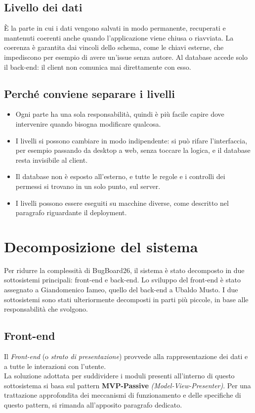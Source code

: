 \subsection{Livello dei dati}
È la parte in cui i dati vengono salvati in modo permanente, recuperati e mantenuti coerenti anche quando l'applicazione viene chiusa o riavviata. La coerenza è garantita dai vincoli dello schema, come le chiavi esterne, che impediscono per esempio di avere un'issue senza autore. Al database accede solo il back-end: il client non comunica mai direttamente con esso.

\subsection{Perché conviene separare i livelli}
\begin{itemize}
  \item Ogni parte ha una sola responsabilità, quindi è più facile capire dove intervenire quando bisogna modificare qualcosa.
  \item I livelli si possono cambiare in modo indipendente: si può rifare l'interfaccia, per esempio passando da desktop a web, senza toccare la logica, e il database resta invisibile al client.
  \item Il database non è esposto all'esterno, e tutte le regole e i controlli dei permessi si trovano in un solo punto, sul server.
  \item I livelli possono essere eseguiti su macchine diverse, come descritto nel paragrafo riguardante il deployment.
\end{itemize}

\section{Decomposizione del sistema}
Per ridurre la complessità di BugBoard26, il sistema è stato decomposto in due sottosistemi principali: front-end e back-end. Lo sviluppo del front-end è stato assegnato a Giandomenico Iameo, quello del back-end a Ubaldo Musto. I due sottosistemi sono stati ulteriormente decomposti in parti più piccole, in base alle responsabilità che svolgono.

\subsection{Front-end}
Il \textit{Front-end} (o \textit{strato di presentazione}) provvede alla rappresentazione dei dati e a tutte le interazioni con l'utente. \\
\indent La soluzione adottata per suddividere i moduli presenti all'interno di questo sottosistema si basa sul pattern \textbf{MVP-Passive} \textit{(Model-View-Presenter)}. Per una trattazione approfondita dei meccanismi di funzionamento e delle specifiche di questo pattern, si rimanda all'apposito paragrafo dedicato.

